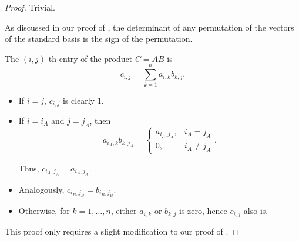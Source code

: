 \begin{proof}
   Trivial.

   As discussed in our proof of , the determinant of any permutation of the vectors of the standard basis is the sign of the permutation.

   The \( (i, j) \)-th entry of the product \( C = AB \) is
  \begin{equation*}
    c_{i,j} = \sum_{k=1}^n a_{i,k} b_{k,j}.
  \end{equation*}

  \begin{itemize}
    \item If \( i = j \), \( c_{i,j} \) is clearly \( 1 \).
    \item If \( i = i_A \) and \( j = j_A \), then
    \begin{equation*}
      a_{i_A,k} b_{k,j_A} = \begin{cases}
        a_{i_A,j_A}, &i_A = j_A \\
        0,           &i_A \neq j_A
      \end{cases}.
    \end{equation*}

    Thus, \( c_{i_A,j_A} = a_{i_A,j_A} \).

    \item Analogously, \( c_{i_B,j_B} = b_{i_B,j_B} \).
    \item Otherwise, for \( k = 1, \ldots, n \), either \( a_{i,k} \) or \( b_{k,j} \) is zero, hence \( c_{i,j} \) also is.
  \end{itemize}

   This proof only requires a slight modification to our proof of .
\end{proof}

\begin{definition}\label{def:upper_row_echelon_form}
\end{definition}

